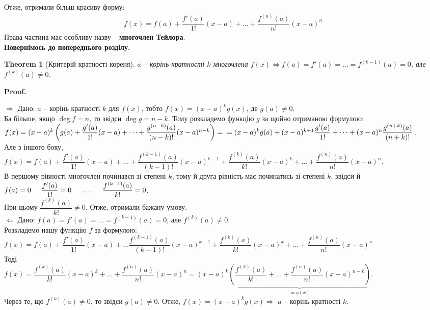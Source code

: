 \documentclass[a4paper, 10pt]{extarticle}
\makeatletter
\def\qed{$\blacksquare$}
\def\qed{$\blacksquare$}
\def\rightproof{$\boxed{\Rightarrow}$ }
\def\leftproof{$\boxed{\Leftarrow}$ }
\theoremstyle{theoremdd}
\newtheorem{theorem}{Theorem}[subsection]
\theoremstyle{theoremdd}
\theoremstyle{theoremdd}
\theoremstyle{theoremdd}
\theoremstyle{theoremdd}
\theoremstyle{theoremdd}
\theoremstyle{theoremdd}
\theoremstyle{theoremdd}
\renewenvironment{proof}[1][Proof.\\]{\par
\pushQED{\hfill \qed}%
\normalfont \topsep6\p@\@plus6\p@\relax
\trivlist
\item\relax
{\bfseries
#1\@addpunct{.}}\hspace\labelsep\ignorespaces
}{%
\popQED\endtrivlist\@endpefalse
}
\makeatother
\begin{document}
Отже, отримали більш красиву форму:
\begin{align*}
f(x) = f(a) + \dfrac{f'(a)}{1!}(x-a) + \dots + \dfrac{f^{(n)}(a)}{n!}(x-a)^n
\end{align*}
Права частина має особливу назву -- \textbf{многочлен Тейлора}.
\bigskip \\
\textbf{Повернімось до попереднього розділу.}
\begin{theorem}[Критерій кратності кореня]
$a$ -- корінь кратності $k$ многочлена $f(x) \iff f(a)=f'(a)=\dots=f^{(k-1)}(a) =0$, але $f^{(k)}(a) \neq 0$.
\end{theorem}

\begin{proof}
\rightproof Дано: $a$ -- корінь кратності $k$ для $f(x)$, тобто $f(x) = (x-a)^k g(x)$, де $g(a) \neq 0$.\\
Ба більше, якщо $\deg f = n$, то звідси $\deg g = n-k$. Тому розкладемо функцію $g$ за щойно отриманою формулою:\\
$f(x) = (x-a)^k \left(g(a) + \dfrac{g'(a)}{1!}(x-a) + \dots + \dfrac{g^{(n-k)}(a)}{(n-k)!}(x-a)^{n-k} \right) = \\
= (x-a)^k g(a) + (x-a)^{k+1}\dfrac{g'(a)}{1!} + \dots + (x-a)^n\dfrac{g^{(n+k)}(a)}{(n+k)!}$.\\
Але з іншого боку,\\
$f(x) = f(a) + \dfrac{f'(a)}{1!}(x-a) + \dots + \dfrac{f^{(k-1)}(a)}{(k-1)!}(x-a)^{k-1} + \dfrac{f^{(k)}(a)}{k!}(x-a)^{k} + \dots + \dfrac{f^{(n)}(a)}{n!}(x-a)^n$.\\
В першому рівності многочлен починався зі степені $k$, тому й друга рівність має починатись зі степені $k$, звідси й\\
$f(a) = 0 \hspace{0.5 cm} \dfrac{f'(a)}{1!} = 0 \hspace{0.5 cm} \dots \hspace{0.5 cm} \dfrac{f^{(k-1)}(a)}{k!} = 0$.\\
При цьому $\dfrac{f^{(k)}(a)}{k!} \neq 0$. Отже, отримали бажану умову.
\bigskip \\
\leftproof Дано: $f(a)=f'(a)=\dots=f^{(k-1)}(a) =0$, але $f^{(k)}(a) \neq 0$.\\
Розкладемо нашу функцію $f$ за формулою:\\
$f(x) = f(a) + \dfrac{f'(a)}{1!}(x-a) + \dots \dfrac{f^{(k-1)}(a)}{(k-1)!}(x-a)^{k-1} + \dfrac{f^{(k)}(a)}{k!}(x-a)^{k} + \dots + \dfrac{f^{(n)}(a)}{n!}(x-a)^n$\\
Тоді\\
$f(x) = \dfrac{f^{(k)}(a)}{k!}(x-a)^{k} + \dots + \dfrac{f^{(n)}(a)}{n!}(x-a)^n = (x-a)^k \underbrace{\left(\dfrac{f^{(k)}(a)}{k!} + \dots + \dfrac{f^{(n)}(a)}{n!}(x-a)^{n-k} \right)}_{=g(x)}$.\\
Через те, що $f^{(k)}(a) \neq 0$, то звідси $g(a) \neq 0$. Отже, $f(x) = (x-a)^k g(x) \Rightarrow$ $a$ -- корінь кратності $k$.
\end{proof}
\end{document}
